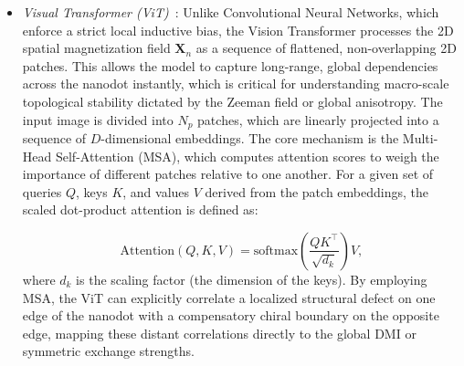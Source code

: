 \documentclass[letterpaper, 12, one column]{article}
\begin{document}
\begin{itemize}
\begin{equation}\label{eq:Xception}
\text{Conv}_{\text{sep}}(\mathbf{X}) = \text{Conv}_{\text{pointwise}}(\text{Conv}_{\text{depthwise}}(\mathbf{X})).
\end{equation}

For nanoscale magnetism, this extreme decoupling allows the network to efficiently isolate specific topological frequency patterns (depthwise) before correlating them to the complex parameter space $\boldsymbol{\theta}_n$ (see Figure~\ref{fig:xception_implementation}).

\begin{figure}[H]
    \centering
    \resizebox{0.85\linewidth}{!}{
    }
\caption{Xception architecture pipeline for Hamiltonian parameter estimation. The feature extractor composed of Entry, Middle, and Exit flows. A detailed horizontal view illustrates the depthwise separable convolution mechanism where spatial feature extraction (depthwise) and cross-channel correlations (pointwise) are entirely decoupled. The final aggregated features are mapped to physical constants.}\label{fig:xception_implementation}
\end{figure}



\item[--] \emph{Visual Transformer (ViT)}~\cite{dosovitskiy2020image}: Unlike Convolutional Neural Networks, which enforce a strict local inductive bias, the Vision Transformer processes the 2D spatial magnetization field $\mathbf{X}_n$ as a sequence of flattened, non-overlapping 2D patches. This allows the model to capture long-range, global dependencies across the nanodot instantly, which is critical for understanding macro-scale topological stability dictated by the Zeeman field or global anisotropy. The input image is divided into $N_p$ patches, which are linearly projected into a sequence of $D$-dimensional embeddings. The core mechanism is the Multi-Head Self-Attention (MSA), which computes attention scores to weigh the importance of different patches relative to one another. For a given set of queries $Q$, keys $K$, and values $V$ derived from the patch embeddings, the scaled dot-product attention is defined as:

\begin{equation}\label{eq:ViT}
\text{Attention}(Q, K, V) = \text{softmax}\left(\frac{QK^\top}{\sqrt{d_k}}\right)V,
\end{equation}
where $d_k$ is the scaling factor (the dimension of the keys). By employing MSA, the ViT can explicitly correlate a localized structural defect on one edge of the nanodot with a compensatory chiral boundary on the opposite edge, mapping these distant correlations directly to the global DMI or symmetric exchange strengths.


\end{itemize}
\end{document}
